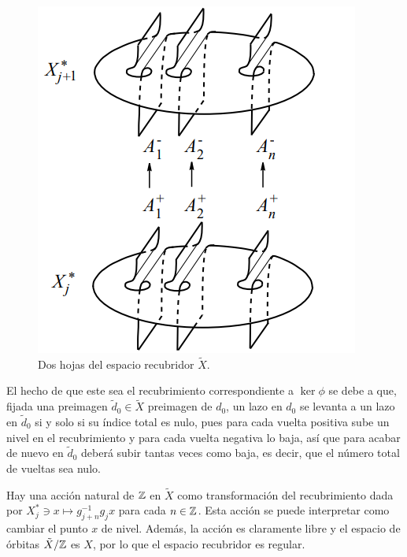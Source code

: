\documentclass[TFG.tex]{subfiles}
\begin{document}

\begin{figure}[h!]
\includegraphics[scale=0.6]{Imagenes/recubrimiento}
\caption{Dos hojas del espacio recubridor $\tilde{X}$.}\label{recubrimiento}
\end{figure}

El hecho de que este sea el recubrimiento correspondiente a $\ker\phi$ se debe a que, fijada una preimagen $\tilde{d}_0\in\tilde{X}$ preimagen de $d_0$, un lazo en $d_0$ se levanta a un lazo en $\tilde{d}_0$ si y solo si su índice total es nulo, pues para cada vuelta positiva sube un nivel en el recubrimiento y para cada vuelta negativa lo baja, así que para acabar de nuevo en $\tilde{d}_0$ deberá subir tantas veces como baja, es decir, que el número total de vueltas sea nulo.

Hay una acción natural de $\mathbb{Z}$ en $\tilde{X}$ como transformación del recubrimiento dada por $X^*_j\ni x\mapsto g_{j+n}^{-1}g_jx$ para cada $n\in\mathbb{Z}$. Esta acción se puede interpretar como cambiar el punto $x$ de nivel. Además, la acción es claramente libre y el espacio de órbitas $\tilde{X}/\mathbb{Z}$ es $X$, por lo que el espacio recubridor es regular.



\end{document}
